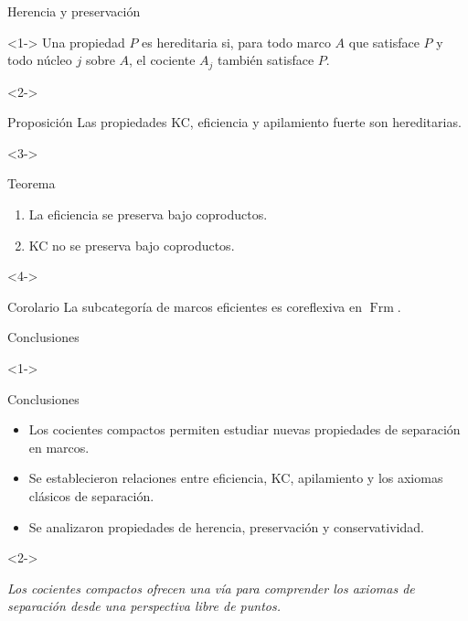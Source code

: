 \documentclass[compress,12pt]{beamer}
\DeclareMathOperator{\Frm}{Frm}
\begin{document}
\begin{frame}{Herencia y preservación}

\begin{uncoverenv}<1->
Una propiedad $P$ es hereditaria 
si, para todo marco $A$ que satisface
$P$ y todo núcleo $j$ sobre $A$,
el cociente $A_j$ también satisface $P$.
\end{uncoverenv}

\begin{uncoverenv}<2->
\begin{block}{Proposición}
Las propiedades KC, eficiencia y
apilamiento fuerte son hereditarias.
\end{block}
\end{uncoverenv}

\begin{uncoverenv}<3->
\begin{block}{Teorema}
\begin{enumerate}
    \item La eficiencia se preserva bajo coproductos.
    \item KC no se preserva bajo coproductos.
\end{enumerate}
\end{block}
\end{uncoverenv}

\begin{uncoverenv}<4->
\begin{block}{Corolario}
La subcategoría de marcos eficientes es
coreflexiva en $\Frm$.
\end{block}
\end{uncoverenv}

\end{frame}


\begin{frame}{Conclusiones}
\begin{uncoverenv}<1->
\begin{block}{Conclusiones}
\begin{itemize}
    \item Los cocientes compactos permiten estudiar
    nuevas propiedades de separación en marcos.

    \item Se establecieron relaciones entre
    eficiencia, KC, apilamiento y los axiomas
    clásicos de separación.

    \item Se analizaron propiedades de herencia,
    preservación y conservatividad.
\end{itemize}
\end{block}
\end{uncoverenv}

\begin{uncoverenv}<2->
\begin{center}
\emph{Los cocientes compactos ofrecen una vía
para comprender los axiomas de separación
desde una perspectiva libre de puntos.}
\end{center}
\end{uncoverenv}

\end{frame}
\end{document}
